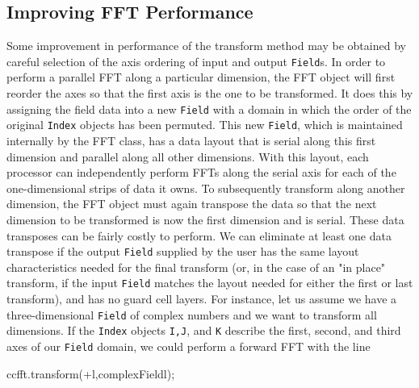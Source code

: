 \subsection{Improving FFT Performance}
Some improvement in performance of the transform method may be obtained by careful selection of the axis ordering of input and output \texttt{Field}s. In order to perform a parallel FFT along a particular dimension, the FFT object will first reorder the axes so that the first axis is the one to be transformed. It does this by assigning the field data into a new \texttt{Field} with a domain in which the order of the original \texttt{Index} objects has been permuted. This new \texttt{Field},
which is maintained internally by the FFT class, has a data layout that is serial along this first dimension and parallel along all other dimensions. With this layout, each processor can independently perform FFTs along the serial axis for each of the one-dimensional strips of data it owns. To subsequently transform along another dimension, the FFT object must again transpose the data so that the next dimension to be transformed is now the first dimension and is serial. These data
transposes can be fairly costly to perform. We can eliminate at least one data transpose if the output \texttt{Field} supplied by the user has the same layout characteristics needed for the final transform (or, in the case of an "in place" transform, if the input \texttt{Field} matches the layout needed for either the first or last transform), and has no guard cell layers. For instance, let us assume we have a three-dimensional \texttt{Field} of complex numbers and we want to transform
all dimensions. If the \texttt{Index} objects {\tt I,J}, and {\tt K} describe the first, second, and third axes of our \texttt{Field} domain, we could perform a forward FFT with the line
\begin{smallcode}
ccfft.transform(+l,complexFieldl);
\end{smallcode}


